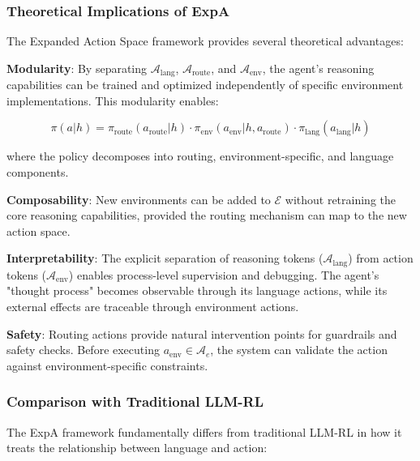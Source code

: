 \subsubsection{Theoretical Implications of ExpA}

The Expanded Action Space framework provides several theoretical advantages:

\textbf{Modularity}: By separating $\mathcal{A}_{\text{lang}}$, $\mathcal{A}_{\text{route}}$, and $\mathcal{A}_{\text{env}}$, the agent's reasoning capabilities can be trained and optimized independently of specific environment implementations. This modularity enables:

$$\pi(a | h) = \pi_{\text{route}}(a_{\text{route}} | h) \cdot \pi_{\text{env}}(a_{\text{env}} | h, a_{\text{route}}) \cdot \pi_{\text{lang}}(a_{\text{lang}} | h)$$

where the policy decomposes into routing, environment-specific, and language components.

\textbf{Composability}: New environments can be added to $\mathcal{E}$ without retraining the core reasoning capabilities, provided the routing mechanism can map to the new action space.

\textbf{Interpretability}: The explicit separation of reasoning tokens ($\mathcal{A}_{\text{lang}}$) from action tokens ($\mathcal{A}_{\text{env}}$) enables process-level supervision and debugging. The agent's "thought process" becomes observable through its language actions, while its external effects are traceable through environment actions.

\textbf{Safety}: Routing actions provide natural intervention points for guardrails and safety checks. Before executing $a_{\text{env}} \in \mathcal{A}_e$, the system can validate the action against environment-specific constraints.

\subsubsection{Comparison with Traditional LLM-RL}

The ExpA framework fundamentally differs from traditional LLM-RL in how it treats the relationship between language and action:


